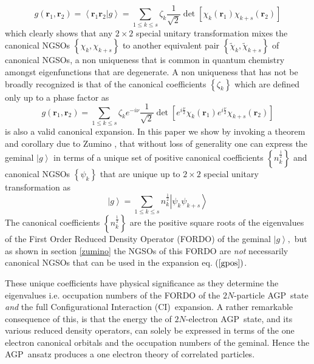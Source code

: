 \documentclass[aps,preprint]{revtex4}%
\begin{document}
\begin{equation}
g\left(  \mathbf{r}_{1},\mathbf{r}_{2}\right)  =\left\langle \mathbf{r}%
_{1}\mathbf{r}_{2}|g\right\rangle =\sum_{1\leq k\leq s}\zeta_{k}\frac{1}%
{\sqrt{2}}\det\left[  \chi_{k}\left(  \mathbf{r}_{1}\right)  \chi_{k+s}\left(
\mathbf{r}_{2}\right)  \right]  \label{gslat}%
\end{equation}
which clearly shows that any $2\times2$ special unitary transformation mixes
the canonical NGSOs $\left\{  \chi_{k},\chi_{k+s}\right\}  $ to another
equivalent pair $\left\{  \tilde{\chi}_{k},\tilde{\chi}_{k+s}\right\}  $ of
canonical NGSOs, a non uniqueness that is common in quantum chemistry amongst
eigenfunctions that are degenerate. A non uniqueness that has not be broadly
recognized is that of the canonical coefficients $\left\{  \zeta_{k}\right\}
$ which are defined only up to a phase factor as
\begin{equation}
g\left(  \mathbf{r}_{1},\mathbf{r}_{2}\right)  =\sum_{1\leq k\leq s}\zeta
_{k}e^{-i\nu}\frac{1}{\sqrt{2}}\det\left[  e^{i\frac{\nu}{2}}\chi_{k}\left(
\mathbf{r}_{1}\right)  e^{i\frac{\nu}{2}}\chi_{k+s}\left(  \mathbf{r}%
_{2}\right)  \right]
\end{equation}
is also a valid canonical expansion. In this paper we show by invoking a
theorem and corollary due to Zumino \cite{Zumino62}, that without loss of
generality one can express the geminal $\left\vert g\right\rangle $ in terms
of a unique set of positive canonical coefficients $\left\{  n_{k}^{\frac
{1}{2}}\right\}  $ and canonical NGSOs $\left\{  \psi_{k}\right\}  $ that are
unique up to $2\times2$ special unitary transformation as
\begin{equation}
\left\vert g\right\rangle =\sum_{1\leq k\leq s}n_{k}^{\frac{1}{2}}\left\vert
\psi_{k}\psi_{k+s}\right\rangle \label{gpos}%
\end{equation}
The canonical coefficients $\left\{  n_{k}^{\frac{1}{2}}\right\}  $ are the
positive square roots of the eigenvalues of the First Order Reduced Density
Operator (FORDO) of the geminal $\left\vert g\right\rangle ,$ but as shown in
section \ref{zumino} the NGSOs of this FORDO are \emph{not} necessarily
canonical NGSOs that can be used in the expansion eq. $\left(  \ref{gpos}%
\right)  $.

These unique coefficients have physical significance as they determine the
eigenvalues i.e. occupation numbers of the FORDO of the $2N$-particle
AGP\ state \emph{and} the full Configurational Interaction (CI)\ expansion. A
rather remarkable consequence of this, is that the energy the of $2N$-electron
AGP\ state, and its various reduced density operators, can solely be expressed
in terms of the one electron canonical orbitals and the occupation numbers of
the geminal. Hence the AGP\ ansatz produces a one electron theory of
correlated particles.
\end{document}
